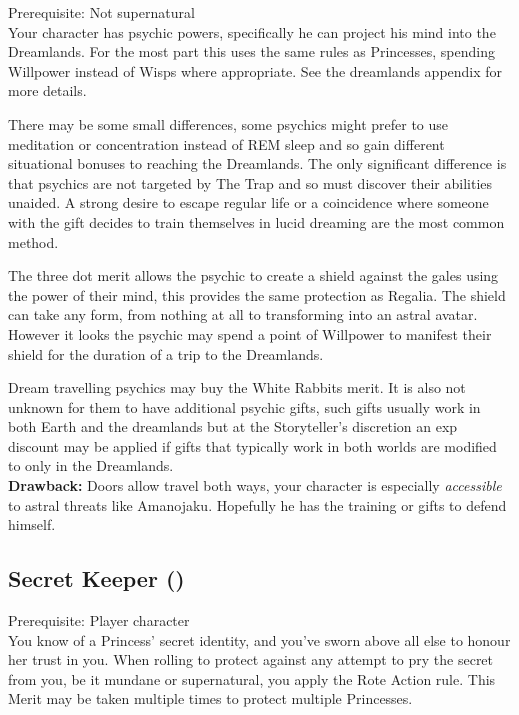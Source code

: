 Prerequisite: Not supernatural\\

\noindent Your character has psychic powers, specifically he can project his mind into the Dreamlands. For the most part this uses the same rules as Princesses, spending Willpower instead of Wisps where appropriate. See the dreamlands appendix for more details. 

There may be some small differences, some psychics might prefer to use meditation or concentration instead of REM sleep and so gain different situational bonuses to reaching the Dreamlands. The only significant difference is that psychics are not targeted by The Trap and so must discover their abilities unaided. A strong desire to escape regular life or a coincidence where someone with the gift decides to train themselves in lucid dreaming are the most common method. 

The three dot merit allows the psychic to create a shield against the gales using the power of their mind, this provides the same protection as Regalia. The shield can take any form, from nothing at all to transforming into an astral avatar. However it looks the psychic may spend a point of Willpower to manifest their shield for the duration of a trip to the Dreamlands. 

Dream travelling psychics may buy the White Rabbits merit. It is also not unknown for them to have additional psychic gifts, such gifts usually work in both Earth and the dreamlands but at the Storyteller's discretion an exp discount may be applied if gifts that typically work in both worlds are modified to only in the Dreamlands. \\

\textbf{Drawback:} Doors allow travel both ways, your character is especially \textit{accessible} to astral threats like Amanojaku. Hopefully he has the training or gifts to defend himself.

\subsection*{Secret Keeper (\textbullet\textbullet)}

Prerequisite: Player character\\

You know of a Princess' secret identity, and you've sworn above all else to honour her trust in you. When rolling to protect against any attempt to pry the secret from you, be it mundane or supernatural, you apply the Rote Action rule. This Merit may be taken multiple times to protect multiple Princesses. 

